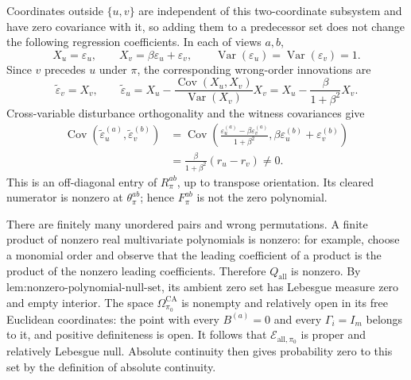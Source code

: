 Coordinates outside \(\{u,v\}\) are independent of this two-coordinate subsystem and have zero covariance with it, so adding them to a predecessor set does not change the following regression coefficients.  In each of views \(a,b\),
\[
X_u=\varepsilon_u,
\qquad
X_v=\beta\varepsilon_u+\varepsilon_v,
\qquad
\operatorname{Var}(\varepsilon_u)=\operatorname{Var}(\varepsilon_v)=1.
\]
Since \(v\) precedes \(u\) under \(\pi\), the corresponding wrong-order innovations are
\[
\widetilde\varepsilon_v=X_v,
\qquad
\widetilde\varepsilon_u
=X_u-\frac{\operatorname{Cov}(X_u,X_v)}{\operatorname{Var}(X_v)}X_v
=X_u-\frac{\beta}{1+\beta^2}X_v.
\]
Cross-variable disturbance orthogonality and the witness covariances give
\[
\begin{aligned}
\operatorname{Cov}\!\left(
\widetilde\varepsilon_u^{(a)},
\widetilde\varepsilon_v^{(b)}
\right)
&=
\operatorname{Cov}\!\left(
\frac{\varepsilon_u^{(a)}-\beta\varepsilon_v^{(a)}}{1+\beta^2},
\beta\varepsilon_u^{(b)}+\varepsilon_v^{(b)}
\right)\\
&=\frac{\beta}{1+\beta^2}(r_u-r_v)\ne0.
\end{aligned}
\]
This is an off-diagonal entry of \(R_\pi^{ab}\), up to transpose orientation.  Its cleared numerator is nonzero at \(\theta_\pi^{ab}\); hence \(F_\pi^{ab}\) is not the zero polynomial.

There are finitely many unordered pairs and wrong permutations.  A finite product of nonzero real multivariate polynomials is nonzero: for example, choose a monomial order and observe that the leading coefficient of a product is the product of the nonzero leading coefficients.  Therefore \(Q_{\mathrm{all}}\) is nonzero.  By \(\text{lem:nonzero-polynomial-null-set}\), its ambient zero set has Lebesgue measure zero and empty interior.  The space \(\Omega_{\pi_0}^{\mathrm{CA}}\) is nonempty and relatively open in its free Euclidean coordinates: the point with every \(B^{(a)}=0\) and every \(\Gamma_i=I_m\) belongs to it, and positive definiteness is open.  It follows that \(\mathcal E_{\mathrm{all},\pi_0}\) is proper and relatively Lebesgue null.  Absolute continuity then gives probability zero to this set by the definition of absolute continuity.

